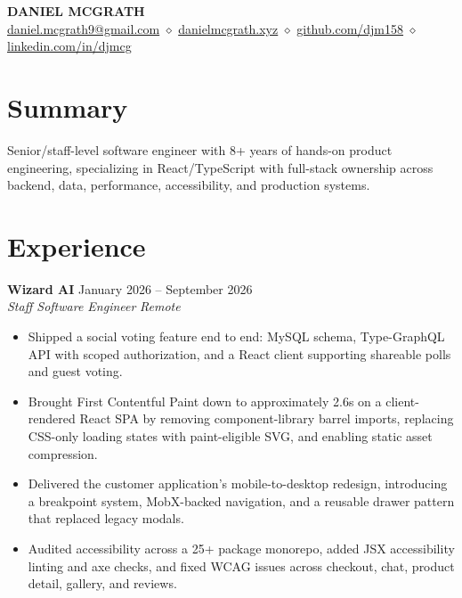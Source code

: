 \documentclass[10pt,letterpaper]{article}
\newcommand{\role}[4]{%
  \Needspace{2.5\baselineskip}%
  \textbf{#1} \hfill #2\\[-2pt]
  \textit{#3} \hfill \textit{#4}\\[-4.4pt]
}
\begin{document}
\fontsize{9.6pt}{10.35pt}\selectfont

\begin{center}
  {\Large\bfseries DANIEL MCGRATH}\\[2pt]
  \small
  \href{mailto:daniel.mcgrath9@gmail.com}{daniel.mcgrath9@gmail.com}
  \; $\diamond$ \;
  \href{https://danielmcgrath.xyz}{danielmcgrath.xyz}
  \; $\diamond$ \;
  \href{https://github.com/djm158}{github.com/djm158}
  \; $\diamond$ \;
  \href{https://www.linkedin.com/in/djmcg/}{linkedin.com/in/djmcg}
\end{center}
\vspace{-6pt}

\section{Summary}
Senior/staff-level software engineer with 8+ years of hands-on product engineering, specializing in React/TypeScript with full-stack ownership across backend, data, performance, accessibility, and production systems.

\section{Experience}

\role{Wizard AI}{January 2026 -- September 2026}{Staff Software Engineer}{Remote}
\begin{itemize}
  \item Shipped a social voting feature end to end: MySQL schema, Type-GraphQL API with scoped authorization, and a React client supporting shareable polls and guest voting.
  \item Brought First Contentful Paint down to approximately 2.6s on a client-rendered React SPA by removing component-library barrel imports, replacing CSS-only loading states with paint-eligible SVG, and enabling static asset compression.
  \item Delivered the customer application's mobile-to-desktop redesign, introducing a breakpoint system, MobX-backed navigation, and a reusable drawer pattern that replaced legacy modals.
  \item Audited accessibility across a 25+ package monorepo, added JSX accessibility linting and axe checks, and fixed WCAG issues across checkout, chat, product detail, gallery, and reviews.
\end{itemize}
\end{document}
